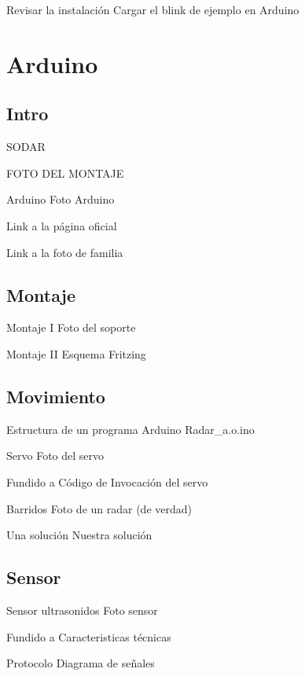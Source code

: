 \documentclass{beamer}
\begin{document}
\begin{frame}{Revisar la instalación}
  Cargar el blink de ejemplo en Arduino
\end{frame}

\section{Arduino}
\subsection{Intro}
\begin{frame}{SODAR}

FOTO DEL MONTAJE
  
\end{frame}

\begin{frame}{Arduino}
  Foto Arduino

  Link a la página oficial

  Link a la foto de familia
\end{frame}

\subsection{Montaje}
\begin{frame}{Montaje I}
  Foto del soporte
\end{frame}

\begin{frame}{Montaje II}
  Esquema Fritzing
\end{frame}

\subsection{Movimiento}

\begin{frame}{Estructura de un programa Arduino}
  Radar\_a.o.ino
\end{frame}

\begin{frame}{Servo}
  Foto del servo

  Fundido a Código de Invocación del servo
  
\end{frame}

\begin{frame}{Barridos}
  Foto de un radar (de verdad)
\end{frame}

\begin{frame}{Una solución}
  Nuestra solución
\end{frame}

\subsection{Sensor}

\begin{frame}{Sensor ultrasonidos}
  Foto sensor

  Fundido a Caracteristicas técnicas
\end{frame}

\begin{frame}{Protocolo}
  Diagrama de señales
\end{frame}
\end{document}
